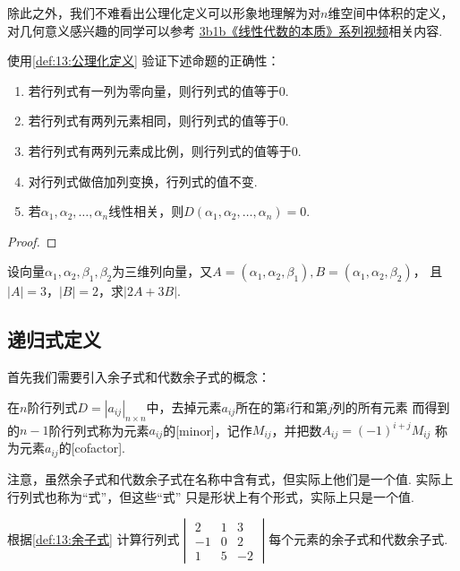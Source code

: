 除此之外，我们不难看出公理化定义可以形象地理解为对$n$维空间中体积的定义，
对几何意义感兴趣的同学可以参考 \href{https://b23.tv/BV1ys411472E}{3b1b《线性代数的本质》系列视频}相关内容.
\begin{example} \label{ex:13:公理化定义}
    使用\autoref{def:13:公理化定义} 验证下述命题的正确性：
    \begin{enumerate}
        \item 若行列式有一列为零向量，则行列式的值等于0.

        \item 若行列式有两列元素相同，则行列式的值等于0.

        \item 若行列式有两列元素成比例，则行列式的值等于0.

        \item 对行列式做倍加列变换，行列式的值不变.

        \item 若$\alpha_1,\alpha_2,\ldots,\alpha_n$线性相关，则$D(\alpha_1,\alpha_2,\ldots,\alpha_n)=0$.
    \end{enumerate}
\end{example}
\begin{proof}

\end{proof}

\begin{example} \label{ex:13:公理化定义2}
    设向量$\alpha_1,\alpha_2,\beta_1,\beta_2$为三维列向量，又$A=(\alpha_1,\alpha_2,\beta_1),B=(\alpha_1,\alpha_2,\beta_2)$，
    且$|A|=3$，$|B|=2$，求$|2A+3B|$.
\end{example}
\begin{solution}

\end{solution}

\subsection{递归式定义}
首先我们需要引入余子式和代数余子式的概念：
\begin{definition} \label{def:13:余子式}
    在$n$阶行列式$D=|a_{ij}|_{n \times n}$中，去掉元素$a_{ij}$所在的第$i$行和第$j$列的所有元素
    而得到的$n-1$阶行列式称为元素$a_{ij}$的[minor]，记作$M_{ij}$，并把数$A_{ij}=(-1)^{i+j}M_{ij}$
    称为元素$a_{ij}$的[cofactor].
\end{definition}
注意，虽然余子式和代数余子式在名称中含有式，但实际上他们是一个值. 实际上行列式也称为``式''，但这些``式''
只是形状上有个形式，实际上只是一个值.
\begin{example} \label{ex:13:余子式}
    根据\autoref{def:13:余子式} 计算行列式$\begin{vmatrix}
        2 & 1 & 3 \\
        -1 & 0 & 2 \\
        1 & 5 & -2
    \end{vmatrix}$每个元素的余子式和代数余子式.
\end{example}
\begin{solution}

\end{solution}

